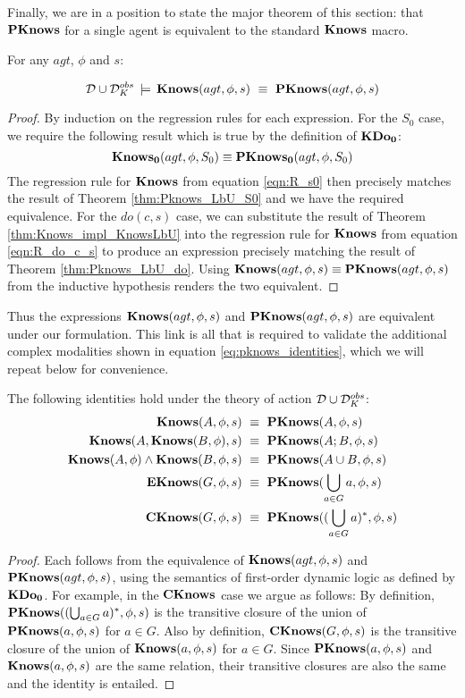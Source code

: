 Finally, we are in a position to state the major theorem of this section:
that $\mathbf{PKnows}$ for a single agent is equivalent to the standard $\mathbf{Knows}$
macro.

\begin{thm}
For any $agt$, $\phi$ and $s$:

\[
\mathcal{D}\cup\mathcal{D}_{K}^{obs}\,\models\,\mathbf{Knows}(agt,\phi,s)\,\,\equiv\,\,\mathbf{PKnows}(agt,\phi,s)\]

\end{thm}
\begin{proof}
By induction on the regression rules for each expression. For the
$S_{0}$ case, we require the following result which is true by the
definition of $\mathbf{KDo_{0}}$:\[
\mathbf{Knows_{0}}(agt,\phi,S_{0})\equiv\mathbf{PKnows_{0}}(agt,\phi,S_{0})\]
 The regression rule for $\mathbf{Knows}$ from equation \eqref{eqn:R_s0}
then precisely matches the result of Theorem \ref{thm:Pknows_LbU_S0}
and we have the required equivalence. For the $do(c,s)$ case, we
can substitute the result of Theorem \ref{thm:Knows_impl_KnowsLbU}
into the regression rule for $\mathbf{Knows}$ from equation \eqref{eqn:R_do_c_s}
to produce an expression precisely matching the result of Theorem
\ref{thm:Pknows_LbU_do}. Using $\mathbf{Knows}(agt,\phi,s)\equiv\mathbf{PKnows}(agt,\phi,s)$
from the inductive hypothesis renders the two equivalent.
\end{proof}
\medskip{}


Thus the expressions $\mathbf{Knows}(agt,\phi,s)$ and $\mathbf{PKnows}(agt,\phi,s)$
are equivalent under our formulation. This link is all that is required
to validate the additional complex modalities shown in equation \eqref{eq:pknows_identities},
which we will repeat below for convenience.

\begin{thm}
The following identities hold under the theory of action $\mathcal{D}\cup\mathcal{D}_{K}^{obs}$:\begin{align*}
\mathbf{Knows}(A,\phi,s) & \,\,\equiv\,\,\mathbf{PKnows}(A,\phi,s)\\
\mathbf{Knows}(A,\mathbf{Knows}(B,\phi),s) & \,\,\equiv\,\,\mathbf{PKnows}(A;B,\phi,s)\\
\mathbf{Knows}(A,\phi)\wedge\mathbf{Knows}(B,\phi,s) & \,\,\equiv\,\,\mathbf{PKnows}(A\cup B,\phi,s)\\
\mathbf{EKnows}(G,\phi,s) & \,\,\equiv\,\,\mathbf{PKnows}(\bigcup_{a\in G}a,\phi,s)\\
\mathbf{CKnows}(G,\phi,s) & \,\,\equiv\,\,\mathbf{PKnows}((\bigcup_{a\in G}a)^{*},\phi,s)\end{align*}

\end{thm}
\begin{proof}
Each follows from the equivalence of $\mathbf{Knows}(agt,\phi,s)$ and $\mathbf{PKnows}(agt,\phi,s)$,
using the semantics of first-order dynamic logic as defined by $\mathbf{KDo_{0}}$.
For example, in the $\mathbf{CKnows}$ case we argue as follows: By definition,
$\mathbf{PKnows}((\bigcup_{a\in G}a)^{*},\phi,s)$ is the transitive closure
of the union of $\mathbf{PKnows}(a,\phi,s)$ for $a\in G$. Also by definition,
$\mathbf{CKnows}(G,\phi,s)$ is the transitive closure of the union of $\mathbf{Knows}(a,\phi,s)$
for $a\in G$. Since $\mathbf{PKnows}(a,\phi,s)$ and $\mathbf{Knows}(a,\phi,s)$
are the same relation, their transitive closures are also the same
and the identity is entailed. 
\end{proof}

